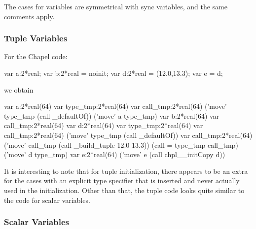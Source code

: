 The cases for  variables are symmetrical with sync variables, and the same comments
apply.

\subsubsection{Tuple Variables}

For the Chapel code:
\begin{chapel}
  var a:2*real;
  var b:2*real = noinit;
  var d:2*real = (12.0,13.3);
  var e = d;
\end{chapel}
\noindent
we obtain
\begin{numberedchapel}
    var a:2*real(64)
    {
      var type_tmp:2*real(64)
      var call_tmp:2*real(64)
      ('move' type_tmp (call _defaultOf))
      ('move' a type_tmp)
    }
    var b:2*real(64)
    var call_tmp:2*real(64)
    var d:2*real(64)
    {
      var type_tmp:2*real(64)
      var call_tmp:2*real(64)
      ('move' type_tmp (call _defaultOf))
      var call_tmp:2*real(64)
      ('move' call_tmp (call _build_tuple 12.0 13.3))
      (call = type_tmp call_tmp)
      ('move' d type_tmp)
    }
    var e:2*real(64)
    ('move' e (call chpl__initCopy d))
\end{numberedchapel}
\noindent
It is interesting to note that for tuple initialization, there appears to be an extra
 for the cases with an explicit type specifier that is inserted and never
actually used in the initialization.   Other than that, the tuple code looks quite similar
to the code for scalar variables.

\subsubsection{Scalar Variables}

